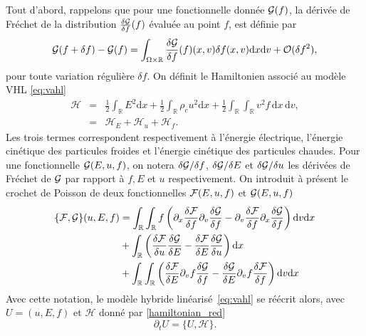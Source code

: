 Tout d'abord, rappelons que pour une fonctionnelle donnée ${\cal G}(f)$, la dérivée de Fréchet de la distribution $\frac{\delta {\cal G}}{\delta f}(f)$ évaluée au point $f$, est définie par 
\begin{equation}
  {\cal G}(f + \delta f) - {\cal G}(f) = \int_{\Omega\times \mathbb{R}} \frac{\delta {\cal G}}{\delta f}(f)(x, v) \delta f(x, v) \mathrm{d}x\mathrm{d}v +{\cal O}(\delta f^2), 
\end{equation}
pour toute variation régulière $\delta f$. On définit le Hamiltonien associé au modèle VHL \eqref{eq:vahl} 
\begin{eqnarray}
\label{hamiltonian_red}
  \mathcal{H} &=& \frac{1}{2}\int_{\mathbb{R}} {E}^2 \mathrm{d}{x}  +  \frac{1}{2}\int_{\mathbb{R}} \rho_{c} u^2\mathrm{d}{x} + \frac{1}{2}\int_{\mathbb{R}}\int_{\mathbb{R}} v^2 f\,\mathrm{d}x\,\mathrm{d}v, \\
              &=&  \mathcal{H}_E + \mathcal{H}_u + \mathcal{H}_f. 
\end{eqnarray}
Les trois termes correspondent respectivement à l'énergie électrique, l'énergie cinétique des particules froides et l'énergie cinétique des particules chaudes. Pour une fonctionnelle ${\cal G}(E, u, f)$, on notera $\delta {\cal G}/\delta f$, $\delta {\cal G}/\delta E$ et $\delta {\cal G}/\delta u$ les dérivées de Fréchet de ${\cal G}$ par rapport à $f, E$ et $u$ respectivement. On introduit à présent le crochet de Poisson de deux fonctionnelles ${\cal F}(E, u, f)$ et ${\cal G}(E, u, f)$
$$
  \begin{aligned}
    \{ {\cal F}, {\cal G} \}( u, E, f) &= \int_{\mathbb{R}}\int_{\mathbb{R}} f \left( \partial_x \frac{\delta {\cal F}}{\delta f}\partial_{v} \frac{\delta {\cal G}}{\delta f} - \partial_{v} \frac{\delta {\cal F}}{\delta f}\partial_{x} \frac{\delta {\cal G}}{\delta f}\right)\mathrm{d}v \mathrm{d}x \\
                         & + \int_{\mathbb{R}}  \left(  \frac{\delta {\cal F}}{\delta{ u}}  \frac{\delta {\cal G}}{\delta{ E}} - \frac{\delta {\cal F}}{\delta{ E}}  \frac{\delta {\cal G}}{\delta{u}} \right) \mathrm{d}x \\
                         & + \int_{\mathbb{R}}\int_{\mathbb{R}}  \left(  \frac{\delta {\cal F}}{\delta{ E}}  \partial_v f\frac{\delta {\cal G}}{\delta{ f}} - \frac{\delta {\cal G}}{\delta{ E}} \partial_v f \frac{\delta {\cal F}}{\delta{f}} \right) \mathrm{d}{ v}\mathrm{d}x \\
  \end{aligned}
$$
Avec cette notation, le modèle hybride linéarisé~\eqref{eq:vahl} se réécrit alors, avec  $U=(u, E, f)$ et $\mathcal{H}$ donné par \eqref{hamiltonian_red}
\begin{equation}
\label{ham_form}
  \partial_t U = \{ U, \mathcal{H} \}. 
\end{equation}

